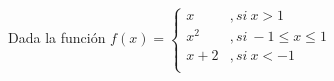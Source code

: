 \documentclass[addpoints,spanish, 12pt,a4paper]{exam}
\begin{document}
\begin{questions}

\question[10] Dada la función	
$f(x)=\left\{ \begin{matrix}
    x & , si \ x >1 \\
    x^2 & , si \ -1\leq x \leq 1 \\
    x+2 & , si \ x < -1 \\
\end{matrix} \right.$


\end{questions}
\end{document}
